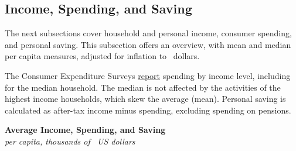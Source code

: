 \documentclass{report}
\makeatletter
\newcommand*\short[1]{\expandafter\@gobbletwo\number\numexpr#1\relax}
\newcommand{\absnode}[3]{\node[below right, align=left] at (axis cs: #1,#2) {#3};}
\newcommand{\shdateaxisticks}{
		date coordinates in=x, axis line style={draw=none},
		xmax={2023-11-01},
		max space between ticks=40,	    
		xtick={{1990-01-01}, {1995-01-01}, {2000-01-01}, 
			{2005-01-01}, {2010-01-01}, {2015-01-01}, {2020-01-01}},
		minor xtick={},
		enlarge y limits={0.06}, enlarge x limits={0.01},
		}
\newcommand{\bbar}[2]{extra #1 ticks = {{#2}}, extra #1 tick labels = ,
		extra #1 tick style = {grid=major, grid style={thick, black!25}},}
\newcommand{\stdline}[4]{\addplot[very thick, no markers, color=#1] 
		table [x=#2, y=#3, col sep=comma] {#4};	}
\newcommand{\rbars}{
		\fill[color=black!10] (axis cs:{1990-07-01},\pgfkeysvalueof{/pgfplots/ymin}) rectangle 
			(axis cs:{1991-03-01}, \pgfkeysvalueof{/pgfplots/ymax});
		\fill[color=black!10] (axis cs:{2007-12-01},\pgfkeysvalueof{/pgfplots/ymin}) rectangle 
			(axis cs:{2009-07-01}, \pgfkeysvalueof{/pgfplots/ymax});
		\fill[color=black!10] (axis cs:{2001-03-01},\pgfkeysvalueof{/pgfplots/ymin}) rectangle 
			(axis cs:{2001-11-01}, \pgfkeysvalueof{/pgfplots/ymax});
		\fill[color=black!10] (axis cs:{2020-02-01},\pgfkeysvalueof{/pgfplots/ymin}) rectangle 
			(axis cs:{2020-05-01}, \pgfkeysvalueof{/pgfplots/ymax});}
\makeatother
\begin{document}
{\begin{minipage}{0.76\textwidth}
\subsection*{Income, Spending, and Saving}      
\small The next subsections cover household and personal income, consumer spending, and personal saving. This subsection offers an overview, with mean and median per capita measures, adjusted for inflation to \unskip \ dollars. 



The Consumer Expenditure Surveys \href{https://www.bls.gov/cex/tables.htm}{report} spending by income level, including for the median household. The median is not affected by the activities of the highest income households, which skew the average (mean). Personal saving is calculated as after-tax income minus spending, excluding spending on pensions.


\end{minipage}
\vspace{2mm}

\begin{minipage}{0.425\textwidth}
\normalsize \textbf{Average Income, Spending, and Saving}\\
\footnotesize{\textit{per capita, thousands of \unskip \ US dollars}}
\vspace{5.5cm}

\hspace{2mm} 


\end{minipage}}
\end{document}
